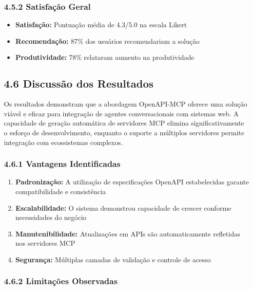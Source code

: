 \documentclass[
]{article}
\providecommand{\tightlist}{%
  \setlength{\itemsep}{0pt}\setlength{\parskip}{0pt}}
\begin{document}
\subsubsection{4.5.2 Satisfação Geral}\label{satisfauxe7uxe3o-geral}

\begin{itemize}
\tightlist
\item
  \textbf{Satisfação:} Pontuação média de 4.3/5.0 na escala Likert
\item
  \textbf{Recomendação:} 87\% dos usuários recomendariam a solução
\item
  \textbf{Produtividade:} 78\% relataram aumento na produtividade
\end{itemize}

\subsection{4.6 Discussão dos
Resultados}\label{discussuxe3o-dos-resultados}

Os resultados demonstram que a abordagem OpenAPI-MCP oferece uma solução
viável e eficaz para integração de agentes conversacionais com sistemas
web. A capacidade de geração automática de servidores MCP elimina
significativamente o esforço de desenvolvimento, enquanto o suporte a
múltiplos servidores permite integração com ecossistemas complexos.

\subsubsection{4.6.1 Vantagens
Identificadas}\label{vantagens-identificadas}

\begin{enumerate}
\def\labelenumi{\arabic{enumi}.}
\tightlist
\item
  \textbf{Padronização:} A utilização de especificações OpenAPI
  estabelecidas garante compatibilidade e consistência
\item
  \textbf{Escalabilidade:} O sistema demonstrou capacidade de crescer
  conforme necessidades do negócio
\item
  \textbf{Manutenibilidade:} Atualizações em APIs são automaticamente
  refletidas nos servidores MCP
\item
  \textbf{Segurança:} Múltiplas camadas de validação e controle de
  acesso
\end{enumerate}

\subsubsection{4.6.2 Limitações
Observadas}\label{limitauxe7uxf5es-observadas}
\end{document}
